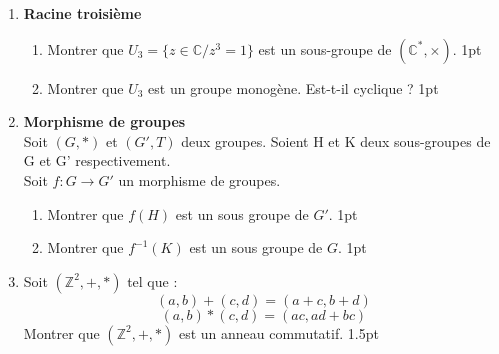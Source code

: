 \documentclass[10pt,openbib,a4paper,openright,a4paper]{article}%
\newcommand{\ensZ}{\mathbb Z}
\newcommand{\ensC}{\mathbb C}
\begin{document}
\begin{enumerate}
\begin{enumerate}
\end{enumerate}
	\item \textbf{Racine troisième}
	\begin{enumerate}
		\item Montrer que $ U_3 = \{ z  \in \ensC / z^3 = 1\}$ est un sous-groupe de $(\ensC^*, \times)$. \hfill 1pt
		\item Montrer que $U_3$ est un groupe monogène. Est-t-il cyclique ? \hfill 1pt
	\end{enumerate} 
	
	\item \textbf{Morphisme de groupes}
	\\Soit $(G,*)$ et $(G', T)$ deux groupes. Soient H et K deux sous-groupes de G et G' respectivement. \\ Soit $f : G \longrightarrow G'$ un morphisme de groupes. 
	\begin{enumerate}
		\item Montrer que $f(H)$ est un sous groupe de $G'$. \hfill 1pt 
		\item Montrer que $f^{-1}(K)$ est un sous groupe de $G$. \hfill 1pt
	\end{enumerate}
	\item Soit $(\ensZ^2, + , *)$ tel que : 
	$$ (a,b)+(c,d) = (a+c, b+d)$$
	$$ (a,b)*(c,d) = (ac, ad+bc)$$
 Montrer que $(\ensZ^2, + , *)$ est un anneau commutatif. \hfill 1.5pt
		
\end{enumerate}
\end{document}
